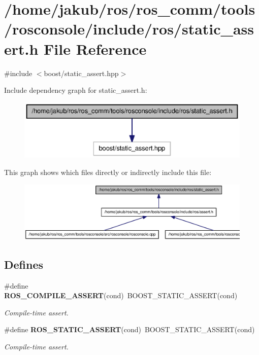 \section{/home/jakub/ros/ros\_\-comm/tools/rosconsole/include/ros/static\_\-assert.h File Reference}
\label{static__assert_8h}
{\ttfamily \#include $<$boost/static\_\-assert.hpp$>$}\par
Include dependency graph for static\_\-assert.h:
\nopagebreak
\begin{figure}[H]
\begin{center}
\leavevmode
\includegraphics[width=370pt]{static__assert_8h__incl}
\end{center}
\end{figure}
This graph shows which files directly or indirectly include this file:
\nopagebreak
\begin{figure}[H]
\begin{center}
\leavevmode
\includegraphics[width=400pt]{static__assert_8h__dep__incl}
\end{center}
\end{figure}
\subsection*{Defines}
\begin{DoxyCompactItemize}
\item 
\#define {\bf ROS\_\-COMPILE\_\-ASSERT}(cond)~BOOST\_\-STATIC\_\-ASSERT(cond)
\begin{DoxyCompactList}\small\item\em Compile-\/time assert. \end{DoxyCompactList}\item 
\#define {\bf ROS\_\-STATIC\_\-ASSERT}(cond)~BOOST\_\-STATIC\_\-ASSERT(cond)
\begin{DoxyCompactList}\small\item\em Compile-\/time assert. \end{DoxyCompactList}\end{DoxyCompactItemize}


